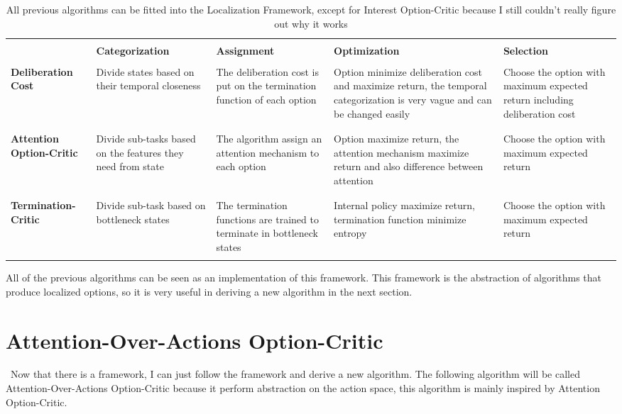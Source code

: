 \documentclass{article}
\begin{document}
	\begin{table}[H]
		\begin{center}
			\begin{tabular}{|p{23mm}||p{30mm}|p{30mm}|p{30mm}|p{30mm}|}
				\hline
				&&&&\\
				&\centering \bfseries Categorization&\centering \bfseries Assignment&\centering \bfseries Optimization&\bfseries \hspace{0.25in} Selection \\
				\hline\hline
				&&&&\\
				\bfseries Deliberation Cost&\small Divide states based on their temporal closeness&\small The deliberation cost is put on the termination function of each option&\small Option minimize deliberation cost and maximize return, the temporal categorization is very vague and can be changed easily &\small Choose the option with maximum expected return including deliberation cost\\
				&&&&\\
				\hline
				&&&&\\
				\bfseries Attention Option-Critic&\small Divide sub-tasks based on the features they need from state&\small The algorithm assign an attention mechanism to each option&\small Option maximize return, the attention mechanism maximize return and also difference between attention&\small Choose the option with maximum expected return\\
				&&&&\\
				\hline
				&&&&\\
				\bfseries Termination-Critic&\small Divide sub-task based on bottleneck states&\small The termination functions are trained to terminate in bottleneck states&\small Internal policy maximize return, termination function minimize entropy&\small Choose the option with maximum expected return\\
				&&&&\\
				\hline
			\end{tabular}
			\caption{All previous algorithms can be fitted into the Localization Framework, except for Interest Option-Critic because I still couldn't really figure out why it works}
		\end{center}
	\end{table}
	\quad All of the previous algorithms can be seen as an implementation of this framework. This framework is the abstraction of algorithms that produce localized options, so it is very useful in deriving a new algorithm in the next section.
	\section{Attention-Over-Actions Option-Critic}
	\qquad \ Now that there is a framework, I can just follow the framework and derive a new algorithm. The following algorithm will be called Attention-Over-Actions Option-Critic because it perform abstraction on the action space, this algorithm is mainly inspired by Attention Option-Critic.
\end{document}
